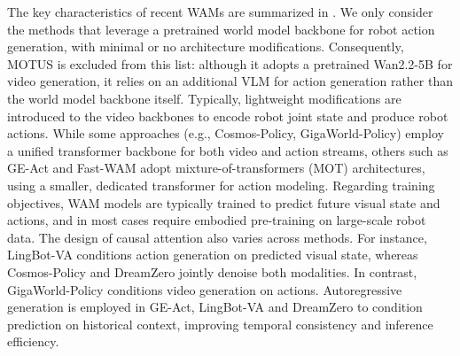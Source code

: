 \documentclass{article}
\begin{document}
The key characteristics of recent WAMs are summarized in . We only consider the methods that leverage a pretrained world model backbone for robot action generation, with minimal or no architecture modifications. Consequently, MOTUS is excluded from this list: although it adopts a pretrained Wan2.2-5B for video generation, it relies on an additional VLM for action generation rather than the world model backbone itself. Typically, lightweight modifications are introduced to the video backbones to encode robot joint state and produce robot actions. While some approaches (e.g., Cosmos-Policy, GigaWorld-Policy) employ a unified transformer backbone for both video and action streams, others such as GE-Act and Fast-WAM adopt mixture-of-transformers (MOT) architectures, using a smaller, dedicated transformer for action modeling. Regarding training objectives, WAM models are typically trained to predict future visual state and actions, and in most cases require embodied pre-training on large-scale robot data. The design of causal attention also varies across methods. For instance, LingBot-VA conditions action generation on predicted visual state, whereas Cosmos-Policy and DreamZero jointly denoise both modalities. In contrast, GigaWorld-Policy conditions video generation on actions. Autoregressive generation is employed in GE-Act, LingBot-VA and DreamZero to condition prediction on historical context, improving temporal consistency and inference efficiency.
\end{document}
